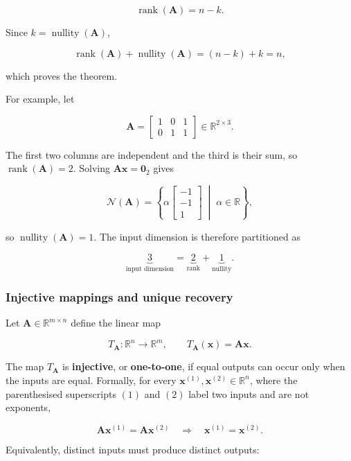\documentclass[
  australian,
  12pt,
  letterpaper,
  DIV=11,
  numbers=noendperiod,
  twoside]{scrreprt}
\begin{document}
\[
\operatorname{rank}(\mathbf A)
=
n-k.
\]

Since \(k=\operatorname{nullity}(\mathbf A)\),

\[
\operatorname{rank}(\mathbf A)
+
\operatorname{nullity}(\mathbf A)
=
(n-k)+k
=
n,
\]

which proves the theorem.

For example, let

\[
\mathbf A
=
\begin{bmatrix}
1&0&1\\
0&1&1
\end{bmatrix}
\in\mathbb R^{2\times3}.
\]

The first two columns are independent and the third is their sum, so
\(\operatorname{rank}(\mathbf A)=2\). Solving
\(\mathbf A\mathbf x=\mathbf0_2\) gives

\[
\mathcal N(\mathbf A)
=
\left\{
\alpha
\begin{bmatrix}
-1\\-1\\1
\end{bmatrix}
\;\middle|\;
\alpha\in\mathbb R
\right\},
\]

so \(\operatorname{nullity}(\mathbf A)=1\). The input dimension is
therefore partitioned as

\[
\underbrace{3}_{\text{input dimension}}
=
\underbrace{2}_{\text{rank}}
+
\underbrace{1}_{\text{nullity}}.
\]

\subsubsection{Injective mappings and unique
recovery}\label{injective-mappings-and-unique-recovery}

Let \(\mathbf A\in\mathbb R^{m\times n}\) define the linear map

\[
T_{\mathbf A}:\mathbb R^n\rightarrow\mathbb R^m,
\qquad
T_{\mathbf A}(\mathbf x)=\mathbf A\mathbf x.
\]

The map \(T_{\mathbf A}\) is \textbf{injective}, or \textbf{one-to-one},
if equal outputs can occur only when the inputs are equal. Formally, for
every \(\mathbf x^{(1)},\mathbf x^{(2)}\in\mathbb R^n\), where the
parenthesised superscripts \((1)\) and \((2)\) label two inputs and are
not exponents,

\[
\mathbf A\mathbf x^{(1)}=\mathbf A\mathbf x^{(2)}
\quad\Longrightarrow\quad
\mathbf x^{(1)}=\mathbf x^{(2)}.
\]

Equivalently, distinct inputs must produce distinct outputs:
\end{document}
